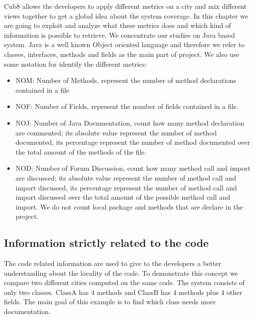 \documentclass[]{usiinfbachelorproject}
\begin{document}
Cub8 allows the developers to apply different metrics on a city and  mix different views together to get a global idea about the system coverage. In this chapter we are going to exploit and analyze what these metrics does and which kind of information is possible to retrieve. 
We concentrate our studies on Java based system. Java is a well known Object oriented language and therefore we refer to classes, interfaces, methods and fields as the main part of project.
We also use some notation for identify the different metrics: 
\begin{itemize}
\item NOM: Number of Methods, represent the number of method declarations contained in a file 
\item NOF: Number of Fields, represent the number of fields contained in a file. 
\item NOJ: Number of Java Documentation, count how many method declaration are commented; its absolute value represent the number of method documented, its percentage represent the number of method  documented over the total amount of the methods of the file.
\item NOD: Number of Forum Discussion, count how many method call and import are discussed; its absolute value represent the number of method call and import discussed, its percentage represent the number of method call and import discussed over the total amount of the possible method call and import. We do not count local package and methods that are declare in the project.
\end{itemize} 

\subsection{Information strictly related to the code}
The code related information are used to give to the developers a better understanding about the locality of the code. To demonstrate this concept we compare two different cities computed on the same code. The system  consists of only two classes. ClassA has 4 methods and ClassB has 4 methods plus 4 other fields. The main goal of this example is to find which class needs more documentation. 
\end{document}
